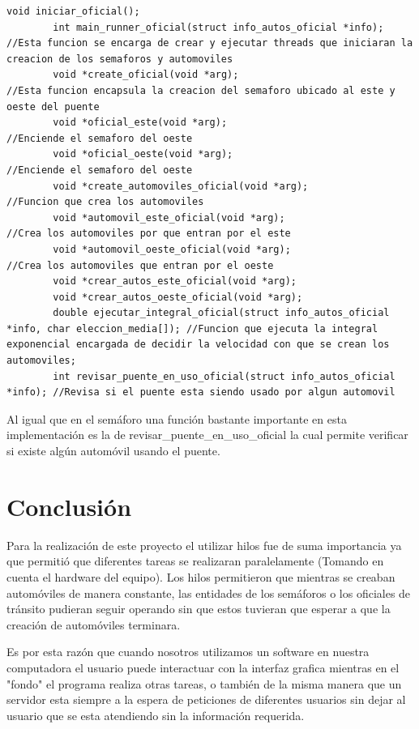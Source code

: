 \documentclass[16pt,a4papper]{article}
\begin{document}
	\begin{lstlisting}[style=CStyle]
		void iniciar_oficial();
		int main_runner_oficial(struct info_autos_oficial *info); //Esta funcion se encarga de crear y ejecutar threads que iniciaran la creacion de los semaforos y automoviles
		void *create_oficial(void *arg);                          //Esta funcion encapsula la creacion del semaforo ubicado al este y oeste del puente
		void *oficial_este(void *arg);                            //Enciende el semaforo del oeste
		void *oficial_oeste(void *arg);                           //Enciende el semaforo del oeste
		void *create_automoviles_oficial(void *arg);              //Funcion que crea los automoviles
		void *automovil_este_oficial(void *arg);                  //Crea los automoviles por que entran por el este
		void *automovil_oeste_oficial(void *arg);                 //Crea los automoviles que entran por el oeste
		void *crear_autos_este_oficial(void *arg);
		void *crear_autos_oeste_oficial(void *arg);
		double ejecutar_integral_oficial(struct info_autos_oficial *info, char eleccion_media[]); //Funcion que ejecuta la integral exponencial encargada de decidir la velocidad con que se crean los automoviles;
		int revisar_puente_en_uso_oficial(struct info_autos_oficial *info); //Revisa si el puente esta siendo usado por algun automovil
	\end{lstlisting}

	Al igual que en el semáforo una función bastante importante en esta implementación es la de revisar\_puente\_en\_uso\_oficial la cual permite verificar si existe algún automóvil usando el puente.
		
	\newpage
	\section{Conclusión}
	Para la realización de este proyecto el utilizar hilos fue de suma importancia ya que permitió que diferentes tareas se realizaran paralelamente (Tomando en cuenta el hardware del equipo). Los hilos permitieron que mientras se creaban automóviles de manera constante, las entidades de los semáforos o los oficiales de tránsito pudieran seguir operando sin que estos tuvieran que esperar a que la creación de automóviles terminara.\par
	
	Es por esta razón que cuando nosotros utilizamos un software en nuestra computadora el usuario puede interactuar con la interfaz grafica mientras en el "fondo" el programa realiza otras tareas, o también de la misma manera que un servidor esta siempre a la espera de peticiones de diferentes usuarios sin dejar al usuario que se esta atendiendo sin la información requerida.\par
	
\end{document}
